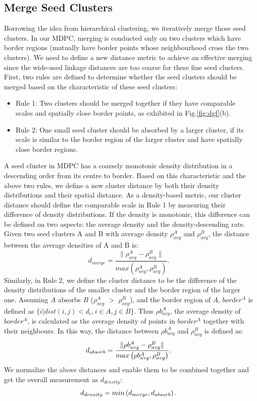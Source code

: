 \documentclass{llncs}
\begin{document}
\subsection{Merge Seed Clusters}
Borrowing the idea from hierarchical clustering, we iteratively merge those seed clusters. In our MDPC, merging is conducted only on two clusters which have border regions (mutually have border points whose neighbourhood cross the two clusters). We need to define a new distance metric to achieve an effective merging since the wide-used linkage distances are too coarse for these fine seed clusters. First, two rules are defined to determine whether the seed clusters should be merged based on the characteristic of these seed clusters:
\begin{itemize}
\item Rule 1: Two clusters should be merged together if they have comparable scales and spatially close border points, as exhibited in Fig.\ref{fig:dgf}(b).
\item Rule 2: One small seed cluster should be absorbed by a larger cluster, if its scale is similar to the border region of the larger cluster and have spatially close border regions.
\end{itemize}
A seed cluster in MDPC has a coarsely monotonic density distribution in a descending order from its centre to border. Based on this characteristic and the above two rules, we define a new cluster distance by both their density distributions and their spatial distance.
As a density-based metric, our cluster distance should define the comparable scale in Rule 1 by measuring their difference of density distributions. If the density is monotonic, this difference can be defined on two aspects: the average density and the density-descending rate. Given two seed clusters A and B with average density $\rho^{A}_{avg}$ and $\rho^{B}_{avg}$, the distance between the average densities of A and B is: 
\begin{equation}
d_{merge} = \frac{\|\rho^{A}_{avg} - \rho^{B}_{avg}\|}{max\left(\rho^{A}_{avg} , \rho^{B}_{avg}\right)}.
\label{eq:S}
\end{equation}
Similarly, in Rule 2, we define the cluster distance to be the difference of the density distributions of the smaller cluster and the border region of the larger one. Assuming $A$ absorbs $B$ ($\rho^{A}_{avg}$ $>$ $\rho^{B}_{avg}$), and the border region of $A$, $border^{A}$  is defined as $\{i | dist(i,j)<d_{c}, i\in A, j \in B\}$. Thus $\rho b^{A}_{avg}$, the average density of $border^{A}$, is calculated as the average density of points in $border^{A}$ together with their neighbours. In this way, the distance between $\rho b^{A}_{avg}$ and $\rho^{B}_{avg}$ is defined as:
\begin{equation}
d_{absorb} = \frac{\|\rho b^{A}_{avg} - \rho^{B}_{avg}\|}{max\left(\rho b^{A}_{avg} , \rho^{B}_{avg}\right)}.
\label{eq:d^{AB}}
\end{equation}
We normalize the above distances and enable them to be combined together and get the overall measurement as $d_{density}$: 
\begin{equation}
d_{density} = min\left(d_{merge} , d_{absorb}\right).
\label{eq:d_{final}}
\end{equation}
\end{document}
